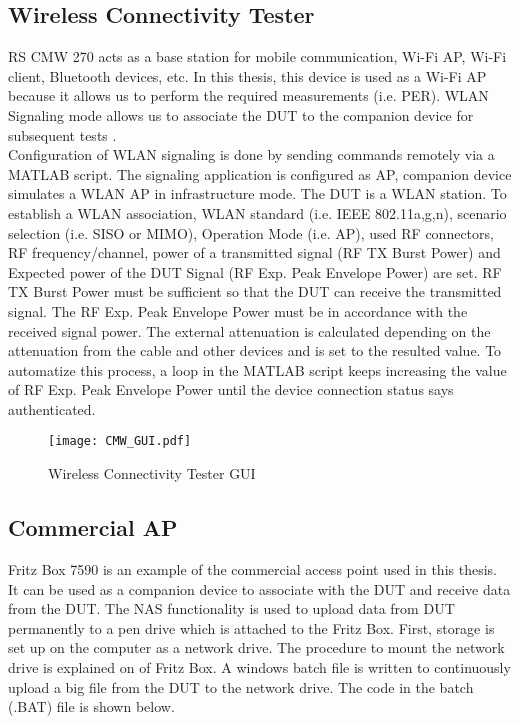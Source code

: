 \subsection{Wireless Connectivity Tester} \label{sec:cmw}
\acs{RS}\textregistered{} CMW 270 acts as a base station for mobile communication, Wi-Fi\texttrademark{} \acs{AP}, Wi-Fi\texttrademark{} client, Bluetooth\textregistered{} devices, etc. In this thesis, this device is used as a Wi-Fi\texttrademark{} \acs{AP} because it allows us to perform the required measurements (i.e. \acf{PER}). \acs{WLAN} Signaling mode allows us to associate the \acs{DUT} to the companion device for subsequent tests \cite{cmw}. \\

Configuration of \acs{WLAN} signaling is done by sending commands remotely via a MATLAB\textregistered{} script.  The signaling application is configured as \acf{AP}, companion device simulates a \acs{WLAN} \acf{AP} in infrastructure mode. The \acs{DUT} is a \acs{WLAN} station. To establish a \acs{WLAN} association, \acs{WLAN} standard (i.e. \acs{IEEE} 802.11a,g,n), scenario selection (i.e. \acs{SISO} or \acs{MIMO}), Operation Mode (i.e. \acs{AP}), used \acs{RF} connectors, \acs{RF} frequency/channel, power of a transmitted signal (\acs{RF} TX Burst Power) and Expected power of the \acs{DUT} Signal (\acs{RF} Exp. Peak Envelope Power) are set. \acs{RF} TX Burst Power must be sufficient so that the \acs{DUT} can receive the transmitted signal. The \acs{RF} Exp. Peak Envelope Power must be in accordance with the received signal power. The external attenuation is calculated depending on the attenuation from the cable and other devices and is set to the resulted value. To automatize this process, a loop in the MATLAB\textregistered{} script keeps increasing the value of \acs{RF} Exp. Peak Envelope Power until the device connection status says authenticated.


\begin{figure}[H]
\centering
\texttt{[image: CMW\_GUI.pdf]}
\caption{Wireless Connectivity Tester \acs{GUI}}
\label{fig:cmwGUI}
\end{figure}


\subsection{Commercial \acf{AP}} \label{sec:golden}
Fritz Box 7590 is an example of the commercial access point used in this thesis. It can be used as a companion device to associate with the \acs{DUT} and receive data from the \acs{DUT}. The \acf{NAS} functionality is used to upload data from \acs{DUT} permanently to a pen drive which is attached to the Fritz Box. First, storage is set up on the computer as a network drive. The procedure to mount the network drive is explained on \cite{fritz} of Fritz Box. A windows batch file is written to continuously upload a big file from the \acs{DUT} to the network drive. The code in the batch (.BAT) file is shown below.

